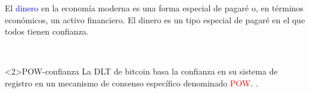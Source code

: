 \begin{frame}

\vspace{5mm}
\begin{displayquote}
El \textcolor{blue}{dinero} en la economía moderna es una forma especial de pagaré o, en términos económicos, un activo financiero. El dinero es un tipo especial de pagaré en el que todos tienen \textcolor{dgreen}{confianza}. 
\end{displayquote}
\raggedleft \cite{Mcleay2014c} \\ 

\vspace{5mm}
\begin{block}<2>{POW-confianza}
La DLT de bitcoin basa la \textcolor{dgreen}{confianza} en su sistema de registro en un mecanismo de consenso específico denominado \textcolor{red}{POW}.  \parencite{Ali2014}.
\end{block}

    
\end{frame}

